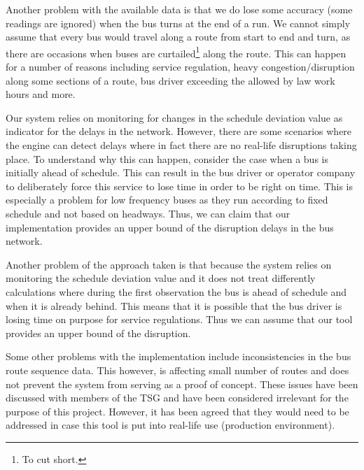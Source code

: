 Another problem with the available data is that we do lose some accuracy (some readings are ignored) when the bus turns at the end of a run. We cannot simply assume that every bus would travel along a route from start to end and turn, as there are occasions when buses are curtailed\footnote{To cut short.} along the route. This can happen for a number of reasons including service regulation, heavy congestion/disruption along some sections of a route, bus driver exceeding the allowed by law work hours and more.

Our system relies on monitoring for changes in the schedule deviation value as indicator for the delays in the network. However, there are some scenarios where the engine can detect delays where in fact there are no real-life disruptions taking place. To understand why this can happen, consider the case when a bus is initially ahead of schedule. This can result in the bus driver or operator company to deliberately force this service to lose time in order to be right on time. This is especially a problem for low frequency buses as they run according to fixed schedule and not based on headways. Thus, we can claim that our implementation provides an upper bound of the disruption delays in the bus network.

Another problem of the approach taken is that because the system relies on monitoring the schedule deviation value and it does not treat differently calculations where during the first observation the bus is ahead of schedule and when it is already behind. This means that it is possible that the bus driver is losing time on purpose for service regulations. Thus we can assume that our tool provides an upper bound of the disruption.

Some other problems with the implementation include inconsistencies in the bus route sequence data. This however, is affecting small number of routes and does not prevent the system from serving as a proof of concept. These issues have been discussed with members of the TSG and have been considered irrelevant for the purpose of this project. However, it has been agreed that they would need to be addressed in case this tool is put into real-life use (production environment). 


